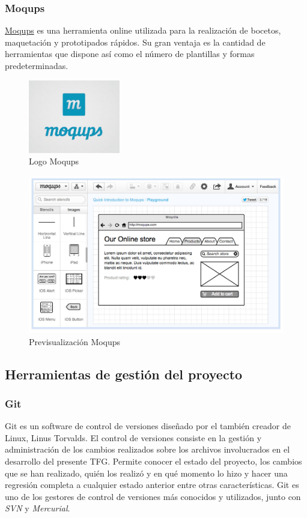 		\subsubsection{Moqups}		
		\href{https://moqups.com}{Moqups} es una herramienta online utilizada para la realización de bocetos, maquetación y prototipados rápidos. Su gran ventaja es la cantidad de herramientas que dispone así como el número de plantillas y formas predeterminadas.
			
		\begin{figure}[H]
		\centering
		\includegraphics[width=40mm, fbox={\fboxrule} 4mm]{images/04-metodo/16-moqups_logo.png}
		\caption{Logo Moqups}
		\label{fig:moqups-logo}
		\end{figure}
		
		\begin{figure}[H]
		\centering
		\includegraphics[width=120mm, fbox={\fboxrule} 4mm]{images/04-metodo/17-moqups_preview.jpg}
		\caption{Previsualización Moqups}
		\label{fig:moqups-preview}
		\end{figure}
		
	\subsection{Herramientas de gestión del proyecto}
		\subsubsection{Git}
		Git es un software de control de versiones diseñado por el también creador de Linux, Linus Torvalds. El control de versiones consiste en la gestión y administración de los cambios realizados sobre los archivos involucrados en el desarrollo del presente \ac{TFG}. Permite conocer el estado del proyecto, los cambios que se han realizado, quién los realizó y en qué momento lo hizo y hacer una regresión completa a cualquier estado anterior entre otras características.
		Git es uno de los gestores de control de versiones más conocidos y utilizados, junto con \textit{\ac{SVN}} y \textit{Mercurial}.
		
